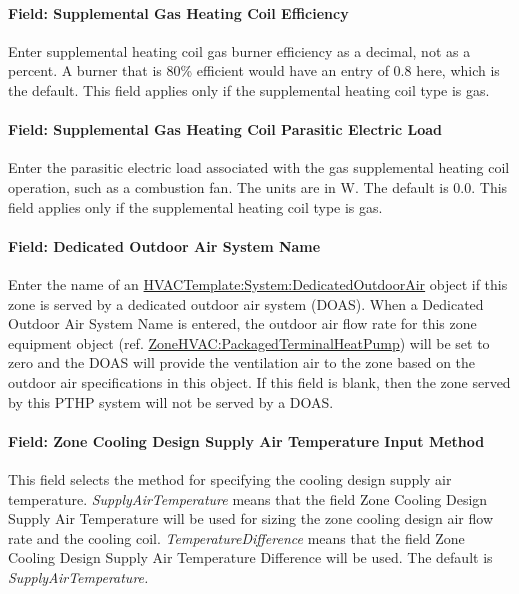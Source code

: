 \paragraph{Field: Supplemental Gas Heating Coil Efficiency}\label{field-supplemental-gas-heating-coil-efficiency}

Enter supplemental heating coil gas burner efficiency as a decimal, not as a percent. A burner that is 80\% efficient would have an entry of 0.8 here, which is the default. This field applies only if the supplemental heating coil type is gas.

\paragraph{Field: Supplemental Gas Heating Coil Parasitic Electric Load}\label{field-supplemental-gas-heating-coil-parasitic-electric-load}

Enter the parasitic electric load associated with the gas supplemental heating coil operation, such as a combustion fan. The units are in W. The default is 0.0. This field applies only if the supplemental heating coil type is gas.

\paragraph{Field: Dedicated Outdoor Air System Name}\label{field-dedicated-outdoor-air-system-name-3}

Enter the name of an \hyperref[hvactemplatesystemdedicatedoutdoorair]{HVACTemplate:System:DedicatedOutdoorAir} object if this zone is served by a dedicated outdoor air system (DOAS). When a Dedicated Outdoor Air System Name is entered, the outdoor air flow rate for this zone equipment object (ref. \hyperref[zonehvacpackagedterminalheatpump]{ZoneHVAC:PackagedTerminalHeatPump}) will be set to zero and the DOAS will provide the ventilation air to the zone based on the outdoor air specifications in this object. If this field is blank, then the zone served by this PTHP system will not be served by a DOAS.

\paragraph{Field: Zone Cooling Design Supply Air Temperature Input Method}\label{field-zone-cooling-design-supply-air-temperature-input-method-2}

This field selects the method for specifying the cooling design supply air temperature. \emph{SupplyAirTemperature} means that the field Zone Cooling Design Supply Air Temperature will be used for sizing the zone cooling design air flow rate and the cooling coil. \emph{TemperatureDifference} means that the field Zone Cooling Design Supply Air Temperature Difference will be used. The default is \emph{SupplyAirTemperature.}

